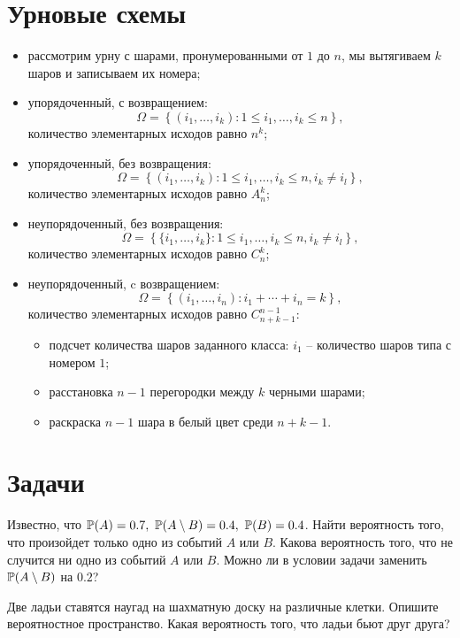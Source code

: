 \section*{Урновые схемы}
\begin{itemize}
    \item
    рассмотрим урну с шарами, пронумерованными от $1$ до $n$, мы вытягиваем $k$ шаров и записываем их номера;
    \item
    упорядоченный, с возвращением:
    \[
        \Omega = \left\{ (i_1, \ldots, i_k): 1 \leq i_1, \ldots, i_k \leq n \right\},
    \]
    количество элементарных исходов равно $n^k$;
    \item
    упорядоченный, без возвращения:
    \[
        \Omega = \left\{ (i_1, \ldots, i_k): 1 \leq i_1, \ldots, i_k \leq n, i_k \neq i_l \right\},
    \]
    количество элементарных исходов равно $A_n^k$;
    \item
    неупорядоченный, без возвращения: 
    \[
        \Omega = \left\{ \{i_1, \ldots, i_k\}: 1 \leq i_1, \ldots, i_k \leq n, i_k \neq i_l \right\},
    \]
    количество элементарных исходов равно $C_n^k$;
    \item
    неупорядоченный, c возвращением: 
    \[
        \Omega = \left\{(i_1, \ldots, i_n): i_1 + \cdots + i_n = k \right\},
    \]
    количество элементарных исходов равно $C^{n - 1}_{n + k - 1}$:
    \begin{itemize}
        \item подсчет количества шаров заданного класса: $i_1$ -- количество шаров типа с номером $1$;
        \item расстановка $n - 1$ перегородки между $k$ черными шарами;
        \item раскраска $n - 1$ шара в белый цвет среди $n + k - 1$.
    \end{itemize} 
\end{itemize}

\section*{Задачи}
\begin{problem}
    Известно, что $\operatorname{\mathbb{P}}(A) = 0.7,\ \operatorname{\mathbb{P}}(A \setminus B) = 0.4,\ \operatorname{\mathbb{P}}(B) = 0.4$.
    Найти вероятность того, что произойдет только одно из событий $A$ или $B$.
    Какова вероятность того, что не случится ни одно из событий $A$ или $B$.
    Можно ли в условии задачи заменить $\operatorname{\mathbb{P}}(A \setminus B)$ на  $0.2$?
\end{problem}

\begin{problem}
    Две ладьи ставятся наугад на шахматную доску на различные клетки.
    Опишите вероятностное пространство.
    Какая вероятность того, что ладьи бьют друг друга?
\end{problem}

